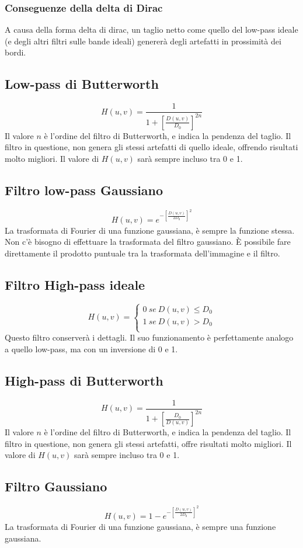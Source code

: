 \documentclass{report}
\begin{document}
	\subsubsection{Conseguenze della delta di Dirac}
	A causa della forma delta di dirac, un taglio netto come quello del low-pass ideale (e degli altri filtri sulle bande ideali) genererà degli artefatti in prossimità dei bordi.
		
	\subsection{Low-pass di Butterworth}
	$$
	H(u,v) = \frac{1}{1+\left[ \frac{D(u,v)}{D_0}\right]^{2n}}
	$$
	Il valore $n$ è l'ordine del filtro di Butterworth, e indica la pendenza del taglio.
	Il filtro in questione, non genera gli stessi artefatti di quello ideale, offrendo risultati molto migliori.
	Il valore di $H(u,v)$ sarà sempre incluso tra 0 e 1.
	\subsection{Filtro low-pass Gaussiano}
	$$
	H(u,v) = e^{-\left[\frac{D(u,v)}{2D_0}\right]^2}
	$$
	La trasformata di Fourier di una funzione gaussiana, è sempre la funzione stessa. Non c'è bisogno di effettuare la trasformata del filtro gaussiano. È possibile fare direttamente il prodotto puntuale tra la trasformata dell'immagine e il filtro.
	\subsection{Filtro High-pass ideale}
	$$
	H(u,v) = \begin{cases}
	0 \ se \ D(u,v) \leq D_0\\
	1 \ se \ D(u,v) > D_0\\
	\end{cases}
	$$
	Questo filtro conserverà i dettagli. Il suo funzionamento è perfettamente analogo a quello low-pass, ma con un inversione di 0 e 1.
	\subsection{High-pass di Butterworth}
	$$
	H(u,v) = \frac{1}{1+\left[ \frac{D_0}{D(u,v)}\right]^{2n}}
	$$
	Il valore $n$ è l'ordine del filtro di Butterworth, e indica la pendenza del taglio.
	Il filtro in questione, non genera gli stessi artefatti, offre risultati molto migliori.
	Il valore di $H(u,v)$ sarà sempre incluso tra 0 e 1.
	\subsection{Filtro Gaussiano}
	$$
	H(u,v) = 1-e^{-\left[\frac{D(u,v)}{2D_0}\right]^2}
	$$
	La trasformata di Fourier di una funzione gaussiana, è sempre una funzione gaussiana.
		
\end{document}
